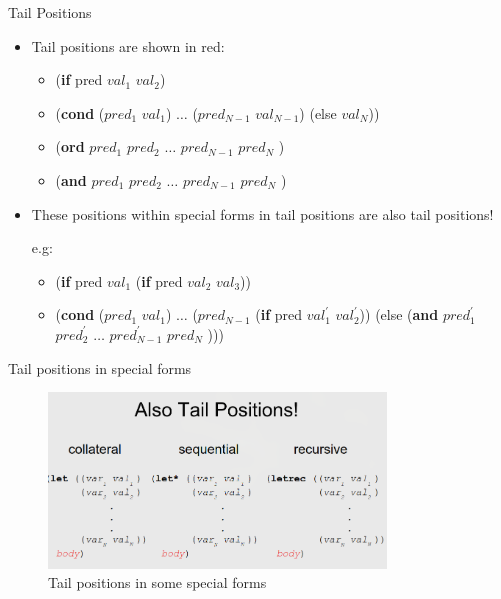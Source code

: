 \documentclass{beamer}
\begin{document}
\begin{frame}{Tail Positions}

  \begin{itemize}
  \item Tail positions are shown in red:
    \begin{itemize}
    \item (\textbf{if} pred {\color{red} $val_1$} {\color{red} $val_2$})
    \item (\textbf{cond} ($pred_1$ {\color{red} $val_1$}) $\dots$
      ($pred_{N-1}$ {\color{red} $val_{N-1}$})
      (else {\color{red} $val_N$}))
    \item (\textbf{ord} $pred_1$ $pred_2$ $\dots$ $pred_{N-1}$ {\color{red} $pred_N$} )
    \item (\textbf{and} $pred_1$ $pred_2$ $\dots$ $pred_{N-1}$ {\color{red} $pred_N$} )
    \end{itemize}
  \item These positions within special forms in tail positions are also tail positions!

    e.g:

    \begin{itemize}
    \item (\textbf{if} pred {\color{red} $val_1$} (\textbf{if} pred {\color{red} $val_2$} {\color{red} $val_3$}))
    \item (\textbf{cond} ($pred_1$ {\color{red} $val_1$}) $\dots$
      ($pred_{N-1}$ (\textbf{if} pred {\color{red} $val_1^{'}$} {\color{red} $val_2^{'}$}))
      (else (\textbf{and} $pred_1^{'}$ $pred_2^{'}$ $\dots$ $pred_{N-1}^{'}$ {\color{red} $pred_N$} )))
    \end{itemize}

  \end{itemize}
\end{frame}

\begin{frame}[fragile]{Tail positions in special forms}
  \begin{figure}[htpb]
    \centering
    \includegraphics[width=0.8\textwidth]{./figures/special_forms_tail_positions.png} 
    \caption{Tail positions in some special forms}
    \label{fig:special_forms_tail_positions}
  \end{figure}
  
\end{frame}
\end{document}
